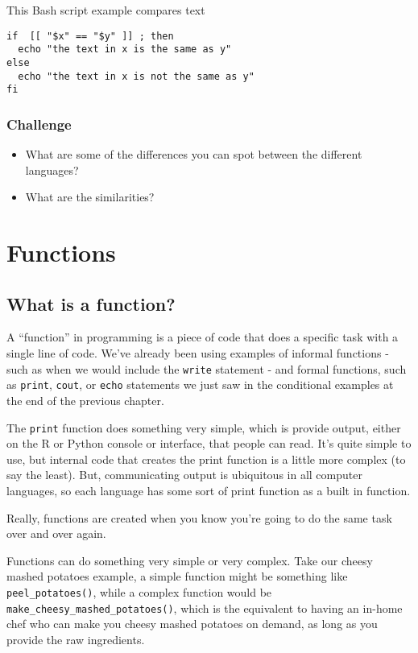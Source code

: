\documentclass[
]{book}
\providecommand{\tightlist}{%
  \setlength{\itemsep}{0pt}\setlength{\parskip}{0pt}}
\begin{document}
This Bash script example compares text

\begin{verbatim}
if  [[ "$x" == "$y" ]] ; then
  echo "the text in x is the same as y"
else
  echo "the text in x is not the same as y"
fi
\end{verbatim}

\subsection{Challenge}\label{challenge}

\begin{itemize}
\tightlist
\item
  What are some of the differences you can spot between the different languages?
\item
  What are the similarities?
\end{itemize}

\chapter{Functions}\label{functions}

\section{What is a function?}\label{what-is-a-function}

A ``function'' in programming is a piece of code that does a specific task with a single line of code. We've already been using examples of informal functions - such as when we would include the \texttt{write} statement - and formal functions, such as \texttt{print}, \texttt{cout}, or \texttt{echo} statements we just saw in the conditional examples at the end of the previous chapter.

The \texttt{print} function does something very simple, which is provide output, either on the R or Python console or interface, that people can read. It's quite simple to use, but internal code that creates the print function is a little more complex (to say the least). But, communicating output is ubiquitous in all computer languages, so each language has some sort of print function as a built in function.

Really, functions are created when you know you're going to do the same task over and over again.

Functions can do something very simple or very complex. Take our cheesy mashed potatoes example, a simple function might be something like \texttt{peel\_potatoes()}, while a complex function would be \texttt{make\_cheesy\_mashed\_potatoes()}, which is the equivalent to having an in-home chef who can make you cheesy mashed potatoes on demand, as long as you provide the raw ingredients.
\end{document}
